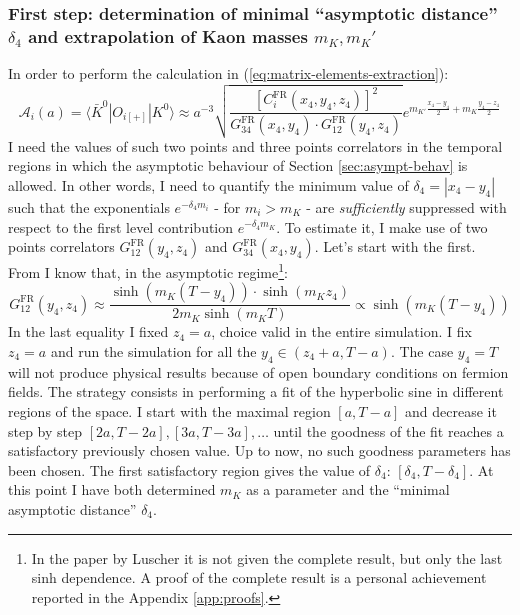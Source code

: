 \documentclass[english, LaM, oneside, noexaminfo]{sapthesis}
\newcommand{\la}{\langle}
\newcommand{\ra}{\rangle}
\begin{document}
\subsubsection*{First step: determination of minimal ``asymptotic distance'' $\delta_4$ and extrapolation of Kaon masses $m_K, m_K'$}
\noindent
In order to perform the calculation in (\ref{eq:matrix-elements-extraction}):
\begin{equation*}
    \mathcal{A}_i (a) = \la \bar K^0 | O_{i[+]} | K^0 \ra \approx a^{-3} \sqrt{\frac{\left[C_i^\text{FR}(x_4,y_4,z_4)\right]^2}{G_{34}^\text{FR}(x_4,y_4) \cdot G_{12}^\text{FR}(y_4,z_4)}} e^{m_{K'}\frac{x_4-y_4}{2} + m_{K}\frac{y_4-z_4}{2}}
\end{equation*}
I need the values of such two points and three points correlators in the temporal regions in which the asymptotic behaviour of Section \ref{sec:asympt-behav} is allowed.
In other words, I need to quantify the minimum value of $\delta_4 = |x_4-y_4|$ such that the exponentials $e^{-\delta_4 m_i}$ - for $m_i > m_K$ - are {\it sufficiently} suppressed with respect to the first level contribution $e^{-\delta_4 m_K}$.
To estimate it, I make use of two points correlators $G_{12}^\text{FR}(y_4,z_4)$ and $G_{34}^\text{FR}(x_4, y_4)$.
Let's start with the first.
From \cite{OBC-tm} I know that, in the asymptotic regime\footnote{In the paper \cite{OBC-tm} by Luscher it is not given the complete result, but only the last sinh dependence. A proof of the complete result is a personal achievement reported in the Appendix \ref{app:proofs}.}:
\begin{equation}\label{eq:sinh}
    G_{12}^\text{FR}(y_4,z_4) \approx \frac{\sinh \left( m_K (T - y_4) \right) \cdot \sinh \left( m_K z_4 \right)}{2 m_K \sinh \left( m_K T \right)} \propto \sinh \left( m_K (T - y_4) \right)
\end{equation}
In the last equality I fixed $z_4 = a$, choice valid in the entire simulation.
I fix $z_4 = a$ and run the simulation for all the $y_4 \in (z_4+a,T-a)$.
The case $y_4 = T$ will not produce physical results because of open boundary conditions on fermion fields.
The strategy consists in performing a fit of the hyperbolic sine in different regions of the space.
I start with the maximal region $[a, T-a]$ and decrease it step by step $[2a,T-2a], [3a,T-3a], \dots $ until the goodness of the fit reaches a satisfactory previously chosen value.
Up to now, no such goodness parameters has been chosen.
The first satisfactory region gives the value of $\delta_4$: $[\delta_4, T-\delta_4]$.
At this point I have both determined $m_K$ as a parameter and the ``minimal asymptotic distance'' $\delta_4$.
\end{document}
